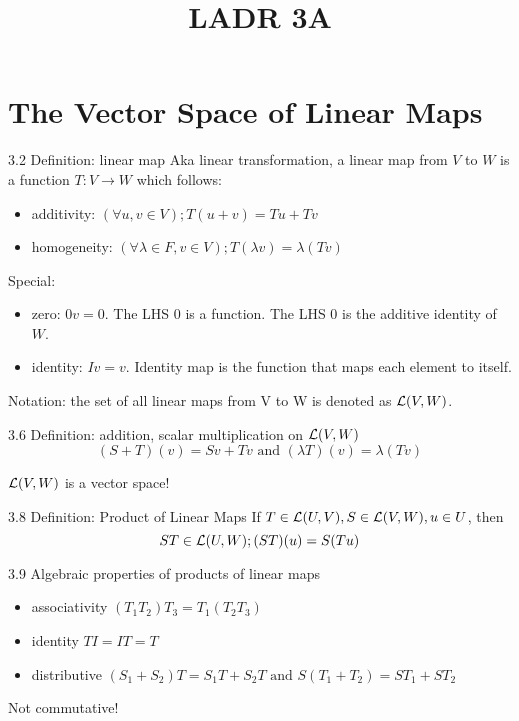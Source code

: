 \documentclass[12pt, letterpaper]{article}
\title{LADR 3A}
\begin{document}
\maketitle

\section*{The Vector Space of Linear Maps}

\begin{imp}
{3.2 Definition: linear map}
Aka linear transformation, a linear map from $V$ to $W$ is a function $T:V\to W$ 
which follows:
\begin{itemize}
  \item additivity: $(\forall u,v\in V); T(u+v)=Tu+Tv$
  \item homogeneity: $(\forall \lambda\in F, v\in V); T(\lambda v)=\lambda(Tv)$
\end{itemize}
Special: 
\begin{itemize}
  \item zero: $0v=0$. The LHS 0 is a function. The LHS 0 is the additive identity of $W$.
  \item identity: $Iv=v$. Identity map is the function that maps each element to itself.
\end{itemize}
\end{imp}
Notation: the set of all linear maps from V to W is denoted as
$\mathcal{L}(V,W)$.

\begin{imp}
{3.6 Definition: addition, scalar multiplication on $\mathcal{L}(V,W)$}
$$(S+T)(v)=Sv+Tv \text{ and } (\lambda T)(v)=\lambda(Tv)$$
\end{imp}
$\mathcal{L}(V,W)$ is a vector space!

\begin{imp}
{3.8 Definition: Product of Linear Maps}
If $T\in\mathcal{L}(U,V),S\in\mathcal{L}(V,W),u\in U$, then
$$ST\in\mathcal{L}(U,W);(ST)(u) = S(Tu)$$
\end{imp}

\begin{imp}
{3.9 Algebraic properties of products of linear maps}
\begin{itemize}
  \item associativity $(T_1T_2)T_3=T_1(T_2T_3)$
  \item identity $TI=IT=T$
  \item distributive $(S_1+S_2)T=S_1T+S_2T\text{ and }S(T_1+T_2)=ST_1+ST_2$
\end{itemize}
\end{imp}
Not commutative!
\end{document}
